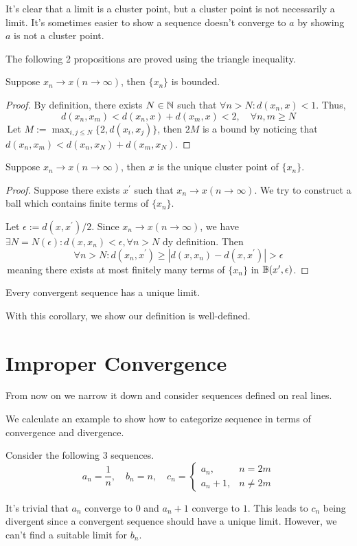 \begin{remark}
    It's clear that a limit is a cluster point, but a cluster point is not necessarily a limit. It's sometimes easier 
    to show a sequence doesn't converge to $a$ by showing $a$ is not a cluster point.
\end{remark}


The following 2 propositions are proved using the triangle inequality.
\begin{proposition}
    Suppose $x_n \to x (n\to \infty)$, then $\{x_n\}$ is bounded.
\end{proposition}
\begin{proof}
    By definition, there exists $N\in\mathbb{N}$ such that $\forall n >N : d(x_n,x)<1$. Thus,
    $$d(x_n,x_m) < d(x_n,x) +d(x_m,x) <2,\quad \forall n,m \geq N$$
    \,Let $M:=\max_{i,j \leq N}\{2,d(x_i,x_j)\}$, then $2M$ is a bound by noticing that 
    $d(x_n,x_m) < d(x_n,x_N) +d(x_m,x_N)$.
\end{proof}

\begin{proposition}
    Suppose $x_n \to x (n\to \infty)$, then $x$ is the unique cluster point of $\{x_n\}$.
\end{proposition}
\begin{proof}
    Suppose there exists $x^{\prime}$ such that $x_n \to x (n\to \infty)$. We try to construct a ball which contains finite terms of $\{x_n\}$.

    Let $\epsilon := d(x,x^{\prime})/2$. Since $x_n \to x (n\to \infty)$, we have $\exists N = N(\epsilon): d(x,x_n) < \epsilon,\forall n>N$ dy definition. Then 
    $$\forall n > N : d(x_n,x^{\prime}) \geq |d(x,x_n) - d(x,x^{\prime})| > \epsilon$$ 
    \,meaning there exists at most finitely many terms of $\{x_n\}$ in $\mathbb{B}(x^{\prime}, \epsilon)$.
\end{proof}

\begin{corollary}
    Every convergent sequence has a unique limit.
\end{corollary}
With this corollary, we show our definition is well-defined.

\section{Improper Convergence}
From now on we narrow it down and consider sequences defined on real lines.

We calculate an example to show how to categorize sequence in terms of convergence and divergence.
\begin{example}
    Consider the following 3 sequences.
    $$a_n = \frac{1}{n},\quad b_n = n, \quad c_n = \begin{cases}
        a_n,& n = 2m\\
        a_n + 1,& n \neq 2m
    \end{cases}$$
\end{example}
It's trivial that $a_n$ converge to $0$ and $a_n+1$ converge to $1$. This leads to $c_n$ being divergent since a convergent sequence should have a unique limit.
However, we can't find a suitable limit for $b_n$.
